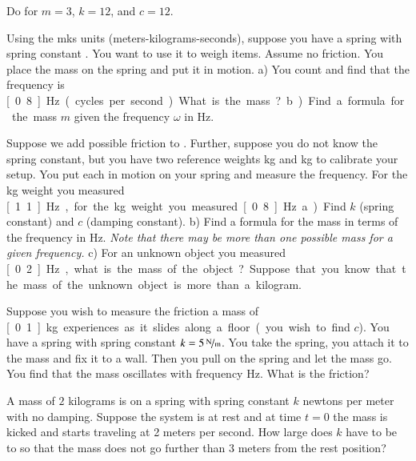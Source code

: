 \begin{exercise}
Do  for
$m=3$, $k=12$, and $c=12$.
\end{exercise}

\begin{exercise} \label{mv:exwt1}
Using the mks units (meters-kilograms-seconds),
suppose you have a spring with spring constant .
You want to use
it to weigh items.  Assume no friction.  You place the mass on
the spring and put it in motion.
a) You count and find that the frequency is
\unit[0.8]{Hz} (cycles per second).  What is the mass?
b) Find a formula for the mass $m$
given the frequency $\omega$ in \unit{Hz}.
\end{exercise}

\begin{exercise}
Suppose we add possible friction to .
Further, suppose you do not know the spring constant, but you have
two reference weights \unit[1]{kg} and \unit[2]{kg} to calibrate your setup.
You put each in motion on your spring and measure the
frequency.  For the \unit[1]{kg}
weight you measured \unit[1.1]{Hz}, for the \unit[2]{kg} weight you
measured \unit[0.8]{Hz}.  a) Find $k$ (spring constant) and $c$ (damping constant).
b) Find a formula for the mass in terms of the frequency in Hz.  \emph{Note that
there may be more than one possible mass for a given frequency.}
c) For an unknown object you measured \unit[0.2]{Hz}, what is the mass of the
object?  Suppose that you know that the mass of the unknown object
is more than a kilogram.
\end{exercise}

\begin{exercise}
Suppose you wish to measure the friction a mass of \unit[0.1]{kg} experiences
as it slides along a floor (you wish to find $c$).  You have a spring with
spring constant $k=\unitfrac[5]{N}{m}$.  You take the spring, you attach it
to the mass and fix it to a wall.  Then you pull on the spring and let the
mass go.  You find that the mass oscillates with frequency \unit[1]{Hz}.
What is the friction?
\end{exercise}

\setcounter{exercise}{100}

\begin{exercise}
A mass of $2$ kilograms is on a spring with spring constant $k$ newtons per
meter with no damping.  Suppose the system is at rest and at time $t=0$ the
mass is kicked and starts traveling at 2 meters per second.  How large
does $k$ have to be to so that the mass does not go further than 3 meters
from the rest position?
\end{exercise}

